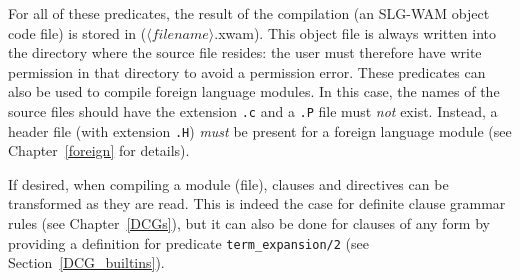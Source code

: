 For all of these predicates, the result of the compilation (an SLG-WAM
object code file) is stored in ($\langle filename \rangle$.xwam). This
object file is always written into the directory where the source file
resides: the user must therefore have write permission in that
directory to avoid a permission error.  These predicates can also be
used to compile foreign language modules.  In this case, the names of
the source files should have the extension {\tt .c} and a {\tt .P}
file must {\em not\/} exist.  Instead, a header file (with extension
{\tt .H}) {\em must} be present for a foreign language module (see
Chapter~\ref{foreign} for details).
 
If desired, when compiling a module (file), clauses and directives can be
transformed as they are read.  This is indeed the case for definite clause
grammar rules (see Chapter~\ref{DCGs}), but it can also be done for clauses
of any form by providing a definition for predicate {\tt term\_expansion/2}
(see Section~\ref{DCG_builtins}).


%
%
%

%

%


